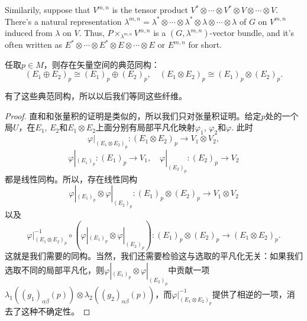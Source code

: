 	Similarily, suppose that $V^{m,n}$ is the tensor product $V^*\otimes \cdots \otimes V^*\otimes V \otimes \cdots \otimes V$. There's a natural representation $\lambda^{m,n}=\lambda^*\otimes \cdots \otimes \lambda^*\otimes \lambda \otimes \cdots \otimes \lambda$ of $G$ on $V^{m,n}$ induced from $\lambda$ on $V$. Thus, $P\times_{\lambda^{m,n}} V^{m,n}$ is a $(G,\lambda^{m,n})$-vector bundle, and it's often written as $E^*\otimes \cdots \otimes E^*\otimes E \otimes \cdots \otimes E$ or $E^{m,n}$ for short.
	

	\begin{pro}
	任取$p\in M$，则存在矢量空间的典范同构：
	\[
		(E_1\oplus E_2)_p\cong (E_1)_p\oplus (E_2)_p,\quad (E_1\otimes E_2)_p\cong (E_1)_p\otimes (E_2)_p.
	\]
	\end{pro}
	
	有了这些典范同构，所以以后我们等同这些纤维。
	
	\begin{proof}
	直和和张量积的证明是类似的，所以我们只对张量积证明。给定$p$处的一个局$U$，在$E_1$, $E_2$和$E_1\otimes E_2$上面分别有局部平凡化映射$\varphi_1$, $\varphi_2$和$\varphi$. 此时
	\[
		\varphi|_{(E_1\otimes E_2)_p}:(E_1\otimes E_2)_p\to V_1\otimes V_2,
	\]
	\[
		\varphi|_{(E_1)_p}:(E_1)_p\to V_1,\quad \varphi|_{(E_2)_p}:(E_2)_p\to V_2
	\]
	都是线性同构。所以，存在线性同构
	\[
		\varphi|_{(E_1)_p}\otimes \varphi|_{(E_2)_p}:(E_1)_p\otimes (E_2)_p\to V_1\otimes V_2
	\]
	以及
	\[
		\varphi|_{(E_1\otimes E_2)_p}^{-1}\circ \left(\varphi|_{(E_1)_p}\otimes \varphi|_{(E_2)_p}\right):(E_1)_p\otimes (E_2)_p\to (E_1\otimes E_2)_p.
	\]
	这就是我们需要的同构。当然，我们还需要检验这与选取的平凡化无关：如果我们选取不同的局部平凡化，则$\varphi|_{(E_1)_p}\otimes \varphi|_{(E_2)_p}$中贡献一项$\lambda_1((g_1)_{\alpha\beta}(p))\otimes \lambda_2((g_2)_{\alpha\beta}(p))$，而$\varphi|_{(E_1\otimes E_2)_p}^{-1}$提供了相逆的一项，消去了这种不确定性。
	\end{proof}
	
	
